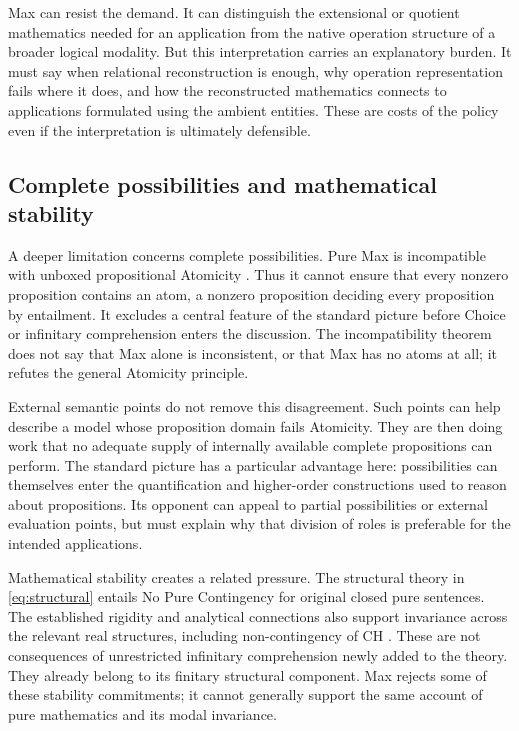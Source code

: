 \documentclass[12pt,letterpaper]{article}
\begin{document}
Max can resist the demand. It can distinguish the extensional or quotient mathematics needed for an application from the native operation structure of a broader logical modality. But this interpretation carries an explanatory burden. It must say when relational reconstruction is enough, why operation representation fails where it does, and how the reconstructed mathematics connects to applications formulated using the ambient entities. These are costs of the policy even if the interpretation is ultimately defensible.

\subsection{Complete possibilities and mathematical stability}

A deeper limitation concerns complete possibilities. Pure Max is incompatible with unboxed propositional Atomicity \citep{maxatomicity}. Thus it cannot ensure that every nonzero proposition contains an atom, a nonzero proposition deciding every proposition by entailment. It excludes a central feature of the standard picture before Choice or infinitary comprehension enters the discussion. The incompatibility theorem does not say that Max alone is inconsistent, or that Max has no atoms at all; it refutes the general Atomicity principle.

External semantic points do not remove this disagreement. Such points can help describe a model whose proposition domain fails Atomicity. They are then doing work that no adequate supply of internally available complete propositions can perform. The standard picture has a particular advantage here: possibilities can themselves enter the quantification and higher-order constructions used to reason about propositions. Its opponent can appeal to partial possibilities or external evaluation points, but must explain why that division of roles is preferable for the intended applications.

Mathematical stability creates a related pressure. The structural theory in \eqref{eq:structural} entails No Pure Contingency for original closed pure sentences. The established rigidity and analytical connections also support invariance across the relevant real structures, including non-contingency of CH \citep{npc,analysisconnections}. These are not consequences of unrestricted infinitary comprehension newly added to the theory. They already belong to its finitary structural component. Max rejects some of these stability commitments; it cannot generally support the same account of pure mathematics and its modal invariance.
\end{document}
